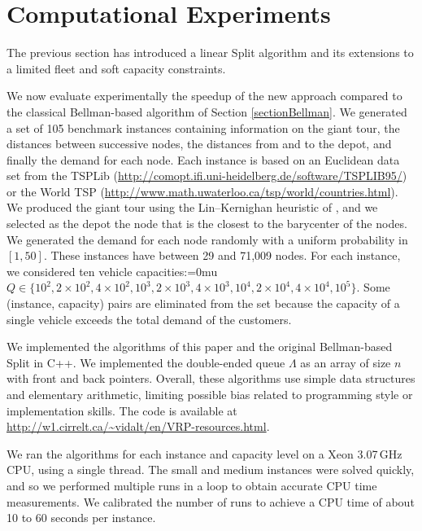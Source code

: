\documentclass[11pt]{article}
\newcommand{\setmuskip}[2]{#1=#2\relax}
\begin{document}
\section{Computational Experiments}
\label{sectionExperiments}

The previous section has introduced a linear Split algorithm and its extensions to a limited fleet and soft capacity constraints. 



We now evaluate experimentally the speedup of the new approach compared to the classical Bellman-based algorithm of Section \ref{sectionBellman}.
We generated a set of 105 benchmark instances containing information on the giant tour, the distances between successive nodes, the distances from and to the depot, and finally the demand for each node. Each instance is based on an Euclidean data set from the TSPLib (\url{http://comopt.ifi.uni-heidelberg.de/software/TSPLIB95/}) or the World TSP (\url{http://www.math.uwaterloo.ca/tsp/world/countries.html}). We produced the giant tour using the Lin--Kernighan heuristic of \cite{Helsgaun2000}, and we selected as the depot the node that is the closest to the barycenter of the nodes. We generated the demand for each node randomly with a uniform probability in $[1,50]$.
These instances have between 29 and 71,009 nodes.
For each instance, we considered ten vehicle capacities:\begingroup \setmuskip{\medmuskip}{0mu}
$Q \in \{10^2,2\times10^2, 4\times10^2, 10^3,2\times10^3, 4\times10^3, 10^4,2\times10^4, 4\times10^4,  10^5\}$.
\endgroup
Some (instance, capacity) pairs are eliminated from the set because the capacity of a single vehicle exceeds the total demand of the customers.

We implemented the algorithms of this paper and the original Bellman-based Split in C++.
We implemented the double-ended queue $\Lambda$ as an array of size $n$ with front and back pointers. Overall, these  algorithms use simple data structures and elementary arithmetic, limiting possible bias related to programming style or implementation skills. The code is available at \url{http://w1.cirrelt.ca/\~vidalt/en/VRP-resources.html}. 

We ran the algorithms for each instance and capacity level on a Xeon 3.07\,GHz CPU, using a single thread. The small and medium instances were solved quickly, and so we performed multiple runs in a loop to obtain accurate CPU time measurements. We calibrated the number of runs to achieve a CPU time of about 10 to 60 seconds per instance. \\
\end{document}
